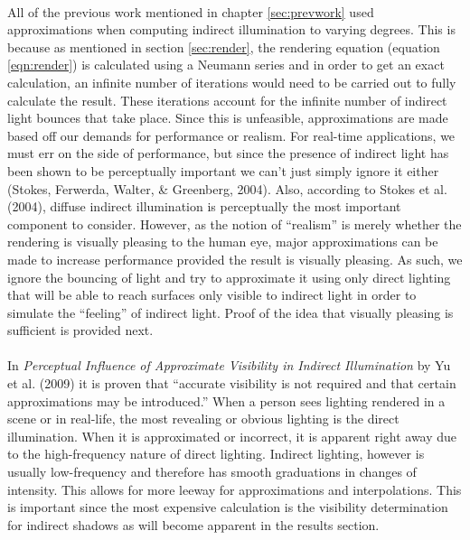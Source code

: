 \paragraph{}
All of the previous work mentioned in chapter \ref{sec:prevwork} used approximations when computing indirect illumination to varying degrees.  This is because as mentioned in section \ref{sec:render}, the rendering equation (equation \ref{eqn:render}) is calculated using a Neumann series and in order to get an exact calculation, an infinite number of iterations would need to be carried out to fully calculate the result.  These iterations account for the infinite number of indirect light bounces that take place.  Since this is unfeasible, approximations are made based off our demands for performance or realism.  For real-time applications, we must err on the side of performance, but since the presence of indirect light has been shown to be perceptually important we can't just simply ignore it either (Stokes, Ferwerda, Walter, \& Greenberg, 2004).  Also, according to Stokes et al. (2004), diffuse indirect illumination is perceptually the most important component to consider.  However, as the notion of ``realism'' is merely whether the rendering is visually pleasing to the human eye, major approximations can be made to increase performance provided the result is visually pleasing.  As such, we ignore the bouncing of light and try to approximate it using only direct lighting that will be able to reach surfaces only visible to indirect light in order to simulate the ``feeling'' of indirect light.  Proof of the idea that visually pleasing is sufficient is provided next.

\paragraph{}
In \textit{Perceptual Influence of Approximate Visibility in Indirect Illumination} by Yu et al. (2009) it is proven that ``accurate visibility is not required and that certain approximations may be introduced.''  When a person sees lighting rendered in a scene or in real-life, the most revealing or obvious lighting is the direct illumination.  When it is approximated or incorrect, it is apparent right away due to the high-frequency nature of direct lighting.  Indirect lighting, however is usually low-frequency and therefore has smooth graduations in changes of intensity.  This allows for more leeway for approximations and interpolations.  This is important since the most expensive calculation is the visibility determination for indirect shadows as will become apparent in the results section.  

